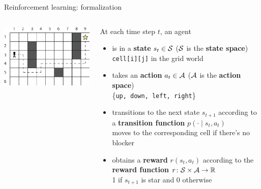 \documentclass[usenames,dvipsnames,notes,11pt,aspectratio=169,hyperref={colorlinks=true, linkcolor=blue}]{beamer}
\begin{document}
\begin{frame}
    {Reinforcement learning: formalization}
    \begin{columns}
        \begin{column}{0.3\textwidth}
        \includegraphics[width=\textwidth]{figures/grid}
        \end{column}
        \begin{column}{0.7\textwidth}
            At each time step $t$, an agent
            \begin{itemize}[<+->]
                \item is in a \textbf{state} $s_t\in\mathcal{S}$ \hfill($\mathcal{S}$ is the {\bf state space})\\ \texttt{cell[i][j]} in the grid world
                \item takes an \textbf{action} $a_t\in\mathcal{A}$ \hfill($\mathcal{A}$ is the {\bf action space})\\
                    \{\texttt{up, down, left, right}\}
                \item transitions to the next state $s_{t+1}$ according to a {\bf transition function} $p(\cdot\mid s_t, a_t)$\\
                    moves to the corresponding cell if there's no blocker
                \item obtains a {\bf reward} $r(s_t, a_t)$ according to
                    the {\bf reward function} $r\colon \mathcal{S} \times \mathcal{A} \rightarrow \mathbb{R}$\\
                    1 if $s_{t+1}$ is star and 0 otherwise
            \end{itemize}
        \end{column}
    \end{columns}
\end{frame}
\end{document}
